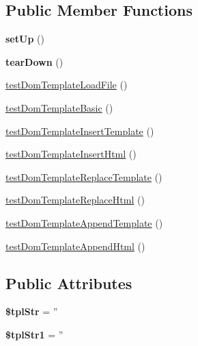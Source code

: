 \subsection*{Public Member Functions}
\begin{DoxyCompactItemize}
\item 
\hypertarget{classDom_1_1Test_1_1TemplateTest_a2ab887fd22759fc757cf9801f26f942e}{{\bfseries set\+Up} ()}\label{classDom_1_1Test_1_1TemplateTest_a2ab887fd22759fc757cf9801f26f942e}

\item 
\hypertarget{classDom_1_1Test_1_1TemplateTest_aae331feccefb31bf99e31c50d5ef2c8f}{{\bfseries tear\+Down} ()}\label{classDom_1_1Test_1_1TemplateTest_aae331feccefb31bf99e31c50d5ef2c8f}

\item 
\hyperlink{classDom_1_1Test_1_1TemplateTest_a73d956693641ecf6424e906e9834082a}{test\+Dom\+Template\+Load\+File} ()
\item 
\hyperlink{classDom_1_1Test_1_1TemplateTest_a06a4c1427cf5583184d9b7511a9ee67f}{test\+Dom\+Template\+Basic} ()
\item 
\hyperlink{classDom_1_1Test_1_1TemplateTest_a4cb4af5fb1a74d669077b145524fbe3f}{test\+Dom\+Template\+Insert\+Template} ()
\item 
\hyperlink{classDom_1_1Test_1_1TemplateTest_ade70f7385b0b6c9693b7cc689bb7bbed}{test\+Dom\+Template\+Insert\+Html} ()
\item 
\hyperlink{classDom_1_1Test_1_1TemplateTest_a142efd73ebe7fddfa7f93e6bc14addfd}{test\+Dom\+Template\+Replace\+Template} ()
\item 
\hyperlink{classDom_1_1Test_1_1TemplateTest_a89722af09b56c70e9fcb3dba72a5a46e}{test\+Dom\+Template\+Replace\+Html} ()
\item 
\hyperlink{classDom_1_1Test_1_1TemplateTest_a60dd5d38ffeb5adcdba2cbc7f71e736b}{test\+Dom\+Template\+Append\+Template} ()
\item 
\hyperlink{classDom_1_1Test_1_1TemplateTest_a312552e9552735a2b3f04f83aa464411}{test\+Dom\+Template\+Append\+Html} ()
\end{DoxyCompactItemize}
\subsection*{Public Attributes}
\begin{DoxyCompactItemize}
\item 
\hypertarget{classDom_1_1Test_1_1TemplateTest_a0e9408df10588216aaa719fc7fffa3d5}{{\bfseries \$tpl\+Str} = ''}\label{classDom_1_1Test_1_1TemplateTest_a0e9408df10588216aaa719fc7fffa3d5}

\item 
\hypertarget{classDom_1_1Test_1_1TemplateTest_ad12d142fb3fc9d2318dabe4297205a81}{{\bfseries \$tpl\+Str1} = ''}\label{classDom_1_1Test_1_1TemplateTest_ad12d142fb3fc9d2318dabe4297205a81}

\end{DoxyCompactItemize}


